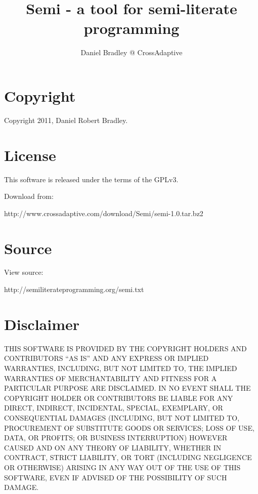 \documentclass[]{article}
\begin{document}
\title{	Semi - a tool for semi-literate programming}
\author{	Daniel Bradley @ CrossAdaptive}
\maketitle
\section*{	Copyright}

Copyright 2011, Daniel Robert Bradley.

\section*{	License}

This software is released under the terms of the GPLv3.


Download from:

\begin{verbatimtab}
http://www.crossadaptive.com/download/Semi/semi-1.0.tar.bz2

\end{verbatimtab}
\section*{	Source}

View source:

\begin{verbatimtab}
http://semiliterateprogramming.org/semi.txt

\end{verbatimtab}
\section*{	Disclaimer}

THIS SOFTWARE IS PROVIDED BY THE COPYRIGHT HOLDERS AND CONTRIBUTORS ``AS IS'' AND ANY EXPRESS OR IMPLIED WARRANTIES, INCLUDING, BUT NOT LIMITED TO, THE IMPLIED WARRANTIES OF MERCHANTABILITY AND FITNESS FOR A PARTICULAR PURPOSE ARE DISCLAIMED. IN NO EVENT SHALL THE COPYRIGHT HOLDER OR CONTRIBUTORS BE LIABLE FOR ANY DIRECT, INDIRECT, INCIDENTAL, SPECIAL, EXEMPLARY, OR CONSEQUENTIAL DAMAGES (INCLUDING, BUT NOT LIMITED TO, PROCUREMENT OF SUBSTITUTE GOODS OR SERVICES; LOSS OF USE, DATA, OR PROFITS; OR BUSINESS INTERRUPTION) HOWEVER CAUSED AND ON ANY THEORY OF LIABILITY, WHETHER IN CONTRACT, STRICT LIABILITY, OR TORT (INCLUDING NEGLIGENCE OR OTHERWISE) ARISING IN ANY WAY OUT OF THE USE OF THIS SOFTWARE, EVEN IF ADVISED OF THE POSSIBILITY OF SUCH DAMAGE.
\end{document}
